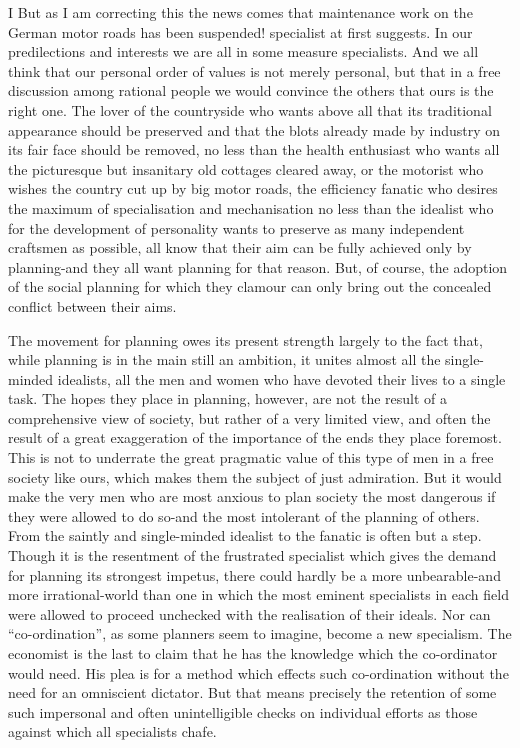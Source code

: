 \documentclass[11pt,openany]{book}
\begin{document}
I But as I am correcting this the news comes that maintenance work on the German motor roads has been suspended! specialist at first suggests. In our predilections and interests we are all in some measure specialists. And we all think that our personal order of values is not merely personal, but that in a free discussion among rational people we would convince the others that ours is the right one. The lover of the countryside who wants above all that its traditional appearance should be preserved and that the blots already made by industry on its fair face should be removed, no less than the health enthusiast who wants all the picturesque but insanitary old cottages cleared away, or the motorist who wishes the country cut up by big motor roads, the efficiency fanatic who desires the maximum of specialisation and mechanisation no less than the idealist who for the development of personality wants to preserve as many independent craftsmen as possible, all know that their aim can be fully achieved only by planning-and they all want planning for that reason. But, of course, the adoption of the social planning for which they clamour can only bring out the concealed conflict between their aims.

The movement for planning owes its present strength largely to the fact that, while planning is in the main still an ambition, it unites almost all the single-minded idealists, all the men and women who have devoted their lives to a single task. The hopes they place in planning, however, are not the result of a comprehensive view of society, but rather of a very limited view, and often the result of a great exaggeration of the importance of the ends they place foremost. This is not to underrate the great pragmatic value of this type of men in a free society like ours, which makes them the subject of just admiration. But it would make the very men who are most anxious to plan society the most dangerous if they were allowed to do so-and the most intolerant of the planning of others. From the saintly and single-minded idealist to the fanatic is often but a step. Though it is the resentment of the frustrated specialist which gives the demand for planning its strongest impetus, there could hardly be a more unbearable-and more irrational-world than one in which the most eminent specialists in each field were allowed to proceed unchecked with the realisation of their ideals. Nor can ``co-ordination'', as some planners seem to imagine, become a new specialism. The economist is the last to claim that he has the knowledge which the co-ordinator would need. His plea is for a method which effects such co-ordination without the need for an omniscient dictator. But that means precisely the retention of some such impersonal and often unintelligible checks on individual efforts as those against which all specialists chafe.
\end{document}
